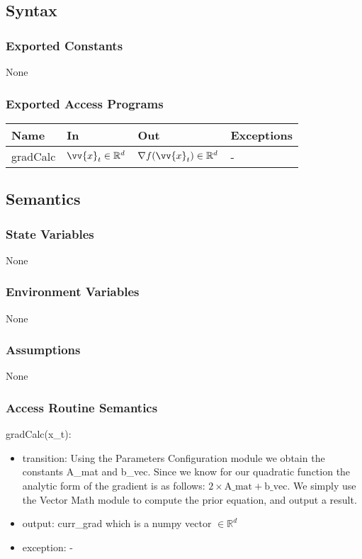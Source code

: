 \documentclass[12pt, titlepage]{article}
\begin{document}
\subsection{Syntax}

\subsubsection{Exported Constants}
None
\subsubsection{Exported Access Programs}

\begin{center}
\begin{tabular}{p{2cm} p{4cm} p{4cm} p{2cm}}
\hline
\textbf{Name} & \textbf{In} & \textbf{Out} & \textbf{Exceptions} \\
\hline
gradCalc & $\vv{x}_{t} \in \mathbb{R}^d$ & $\nabla f(\vv{x}_t) \in \mathbb{R}^d$ & - \\
\hline
\end{tabular}
\end{center}

\subsection{Semantics}
\subsubsection{State Variables}
None

\subsubsection{Environment Variables}

None

\subsubsection{Assumptions}
None
\subsubsection{Access Routine Semantics}

\noindent gradCalc(x\_t):
\begin{itemize}
\item transition: Using the Parameters Configuration module we obtain the constants A\_mat and b\_vec. Since we know for our quadratic function the analytic form of the gradient is as follows: $2 \times \text{A\_mat} + \text{b\_vec}$. We simply use the Vector Math module to compute the prior equation, and output a result.  
\item output: curr\_grad which is a numpy vector $\in \mathbb{R}^d$ 
\item exception: - 
\end{itemize}
\end{document}
